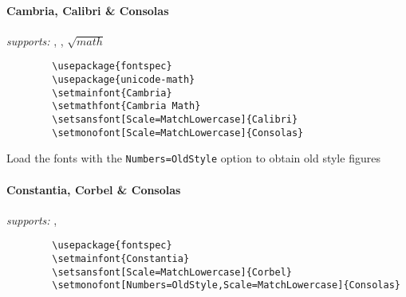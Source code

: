 \documentclass[11pt]{ltxdoc}
\begin{document}
	\raggedleft
	\paragraph*{Cambria, Calibri \& Consolas} \hfill
	\textit{supports:} , , $\sqrt{math}$ \nopagebreak\vspace{-.75em}
	\begin{verbatim}
		\usepackage{fontspec}
		\usepackage{unicode-math}
		\setmainfont{Cambria}
		\setmathfont{Cambria Math}
		\setsansfont[Scale=MatchLowercase]{Calibri}
		\setmonofont[Scale=MatchLowercase]{Consolas}
	\end{verbatim}
	\vspace{-.75em}
	Load the fonts with the \texttt{Numbers=OldStyle} option to obtain old style figures  \hfill \hspace{.01pt}
	
	\paragraph*{Constantia, Corbel \& Consolas} \hfill
	\textit{supports:} ,  \nopagebreak\vspace{-.75em}
	\begin{verbatim}
		\usepackage{fontspec}
		\setmainfont{Constantia}
		\setsansfont[Scale=MatchLowercase]{Corbel}
		\setmonofont[Numbers=OldStyle,Scale=MatchLowercase]{Consolas}
	\end{verbatim}
	
	
	\justifying
	\vfill
	\thispagestyle{empty}
	\listoffigures
\end{document}
